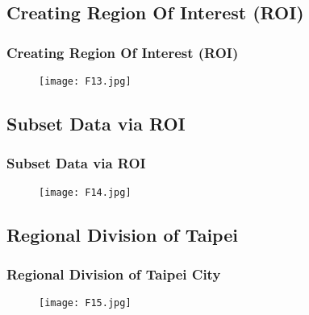 \documentclass[pdflatex,compress,8pt,
	xcolor={dvipsnames,dvipsnames,svgnames,x11names,table},
	hyperref={	
	breaklinks = true, 
	pdfauthor={Lemenkova Polina}, 
	pdfsubject={Preentation}, 
	pdfcreator={Lemenkova Polina}, 
	pdfproducer={Lemenkova Polina}, 
	colorlinks=true,
	linkcolor=Gold1, 
	citecolor=NavyBlue, 
	urlcolor = NavyBlue, 
	breaklinks = true}]{beamer}
\begin{document}
\subsection{Creating Region Of Interest (ROI)}
\begin{frame}\frametitle{Creating Region Of Interest (ROI)}
\begin{figure}[H]
	\centering
		\texttt{[image: F13.jpg]}
\end{figure}
\end{frame}

\subsection{Subset Data via ROI}
\begin{frame}\frametitle{ Subset Data via ROI}
\begin{figure}[H]
	\centering
		\texttt{[image: F14.jpg]}
\end{figure}
\end{frame}

\subsection{Regional Division of Taipei}
\begin{frame}\frametitle{Regional Division of Taipei City}
\begin{figure}[H]
	\centering
		\texttt{[image: F15.jpg]}
\end{figure}
\end{frame}
\end{document}
